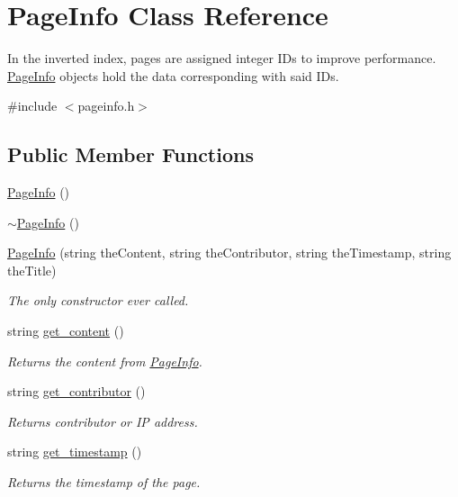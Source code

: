 \hypertarget{class_page_info}{}\section{Page\+Info Class Reference}
\label{class_page_info}


In the inverted index, pages are assigned integer I\+Ds to improve performance. \hyperlink{class_page_info}{Page\+Info} objects hold the data corresponding with said I\+Ds.  




{\ttfamily \#include $<$pageinfo.\+h$>$}

\subsection*{Public Member Functions}
\begin{DoxyCompactItemize}
\item 
\hyperlink{class_page_info_a3ab3b93ca3b3d09645d5e187863b84e6}{Page\+Info} ()
\item 
\hyperlink{class_page_info_a45259793eed3f830dadecfde0e970ec5}{$\sim$\+Page\+Info} ()
\item 
\hyperlink{class_page_info_aa98a49dd45fdea434a27e4892dbdf032}{Page\+Info} (string the\+Content, string the\+Contributor, string the\+Timestamp, string the\+Title)
\begin{DoxyCompactList}\small\item\em The only constructor ever called. \end{DoxyCompactList}\item 
string \hyperlink{class_page_info_a61bd04fcecb67f3fac9833cd4a0e432b}{get\+\_\+content} ()
\begin{DoxyCompactList}\small\item\em Returns the content from \hyperlink{class_page_info}{Page\+Info}. \end{DoxyCompactList}\item 
string \hyperlink{class_page_info_a6569fb1fd2a7efa4a6d144aa87c27912}{get\+\_\+contributor} ()
\begin{DoxyCompactList}\small\item\em Returns contributor or I\+P address. \end{DoxyCompactList}\item 
string \hyperlink{class_page_info_ab2fa01ac638b965912b93fce36d4899a}{get\+\_\+timestamp} ()
\begin{DoxyCompactList}\small\item\em Returns the timestamp of the page. \end{DoxyCompactList}\item 

\end{DoxyCompactItemize}
